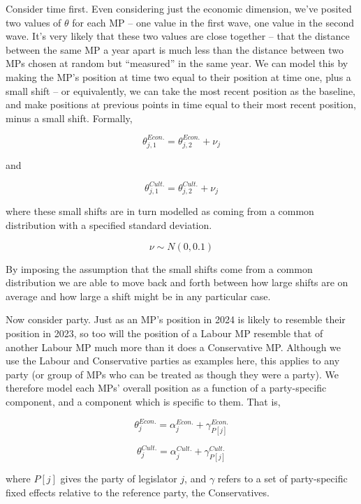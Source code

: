 \documentclass[
]{article}
\begin{document}
Consider time first. Even considering just the economic dimension, we've
posited two values of \(\theta\) for each MP -- one value in the first
wave, one value in the second wave. It's very likely that these two
values are close together -- that the distance between the same MP a
year apart is much less than the distance between two MPs chosen at
random but ``measured'' in the same year. We can model this by making
the MP's position at time two equal to their position at time one, plus
a small shift -- or equivalently, we can take the most recent position
as the baseline, and make positions at previous points in time equal to
their most recent position, minus a small shift. Formally,

\[
\theta^{Econ.}_{j, 1} = \theta^{Econ.}_{j, 2} + \nu_j
\]

and

\[
\theta^{Cult.}_{j, 1} = \theta^{Cult.}_{j, 2} + \nu_j
\]

where these small shifts are in turn modelled as coming from a common
distribution with a specified standard deviation.

\[
\nu \sim N(0, 0.1)
\]

By imposing the assumption that the small shifts come from a common
distribution we are able to move back and forth between how large shifts
are on average and how large a shift might be in any particular case.

Now consider party. Just as an MP's position in 2024 is likely to
resemble their position in 2023, so too will the position of a Labour MP
resemble that of another Labour MP much more than it does a Conservative
MP. Although we use the Labour and Conservative parties as examples
here, this applies to any party (or group of MPs who can be treated as
though they were a party). We therefore model each MPs' overall position
as a function of a party-specific component, and a component which is
specific to them. That is,

\doublespacing

\[
\theta^{Econ.}_j = \alpha^{Econ.}_j + \gamma^{Econ.}_{P[j]}
\]

\[
\theta^{Cult.}_j = \alpha^{Cult.}_j + \gamma^{Cult.}_{P[j]}
\]

\singlespacing

where \(P[j]\) gives the party of legislator \(j\), and \(\gamma\)
refers to a set of party-specific fixed effects relative to the
reference party, the Conservatives.
\end{document}
